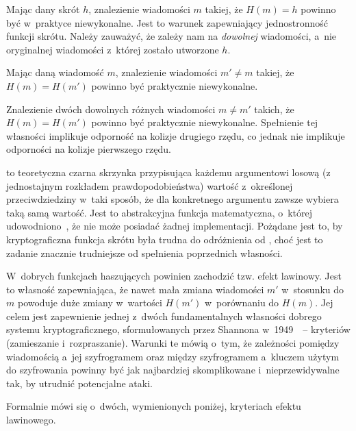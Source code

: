 \documentclass[12pt,a4paper,twoside]{article}
\begin{document}
\label{sec:preimage_resistance}
Mając dany skrót $h$, znalezienie wiadomości $m$ takiej, że $H(m) = h$ powinno
być w~praktyce niewykonalne. Jest to warunek zapewniający jednostronność
funkcji skrótu. Należy zauważyć, że zależy nam na \emph{dowolnej} wiadomości,
a~nie oryginalnej wiadomości z~której zostało utworzone $h$.

\label{sec:second_preimage_resistance}
Mając daną wiadomość $m$, znalezienie wiadomości $m' \neq m$ takiej, że $H(m) =
H(m')$ powinno być praktycznie niewykonalne.

\label{sec:collision_resistance}
Znalezienie dwóch dowolnych różnych wiadomości $m \neq m'$ takich, że $H(m) =
H(m')$ powinno być praktycznie niewykonalne. Spełnienie tej własności implikuje
odporność na kolizje drugiego rzędu, co jednak nie implikuje odporności na
kolizje pierwszego rzędu.

 to teoretyczna czarna skrzynka przypisująca każdemu
argumentowi losową (z jednostajnym rozkładem prawdopodobieństwa) wartość
z~określonej przeciwdziedziny w~taki sposób, że dla konkretnego argumentu
zawsze wybiera taką samą wartość. Jest to abstrakcyjna funkcja matematyczna,
o~której udowodniono~\cite{random_oracle}, że nie może posiadać żadnej
implementacji. Pożądane jest to, by kryptograficzna funkcja skrótu była trudna
do odróżnienia od , choć jest to zadanie znacznie trudniejsze
od spełnienia poprzednich własności.

\label{sec:avalance_effect}
W~dobrych funkcjach haszujących powinien zachodzić tzw. efekt lawinowy. Jest to
własność zapewniająca, że nawet mała zmiana wiadomości $m'$ w~stosunku do $m$
powoduje duże zmiany w~wartości $H(m')$ w~porównaniu do $H(m)$. Jej celem jest
zapewnienie jednej z~dwóch fundamentalnych własności dobrego systemu
kryptograficznego, sformułowanych przez Shannona
w~1949~\cite{confusion_diffusion}~-- kryteriów 
(zamieszanie i~rozpraszanie). Warunki te mówią o~tym, że zależności pomiędzy
wiadomością a~jej szyfrogramem oraz między szyfrogramem a~kluczem użytym do
szyfrowania powinny być jak najbardziej skomplikowane i~nieprzewidywalne tak,
by utrudnić potencjalne ataki.

\noindent Formalnie mówi się o~dwóch, wymienionych poniżej, kryteriach efektu
lawinowego.
\end{document}
